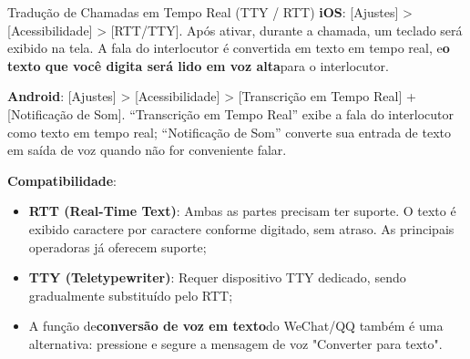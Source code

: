\begin{tcbinfo}{Tradução de Chamadas em Tempo Real (TTY / RTT)}
\textbf{iOS}: [Ajustes] > [Acessibilidade] > [RTT/TTY]. Após ativar, durante a chamada, um teclado será exibido na tela. A fala do interlocutor é convertida em texto em tempo real, e\textbf{o texto que você digita será lido em voz alta}para o interlocutor.

\textbf{Android}: [Ajustes] > [Acessibilidade] > [Transcrição em Tempo Real] + [Notificação de Som]. “Transcrição em Tempo Real” exibe a fala do interlocutor como texto em tempo real; “Notificação de Som” converte sua entrada de texto em saída de voz quando não for conveniente falar.

\textbf{Compatibilidade}:

\begin{itemize}
  \item \textbf{RTT (Real-Time Text)}: Ambas as partes precisam ter suporte. O texto é exibido caractere por caractere conforme digitado, sem atraso. As principais operadoras já oferecem suporte;
  \item \textbf{TTY (Teletypewriter)}: Requer dispositivo TTY dedicado, sendo gradualmente substituído pelo RTT;
  \item A função de\textbf{conversão de voz em texto}do WeChat/QQ também é uma alternativa: pressione e segure a mensagem de voz "Converter para texto".
\end{itemize}

\end{tcbinfo}


